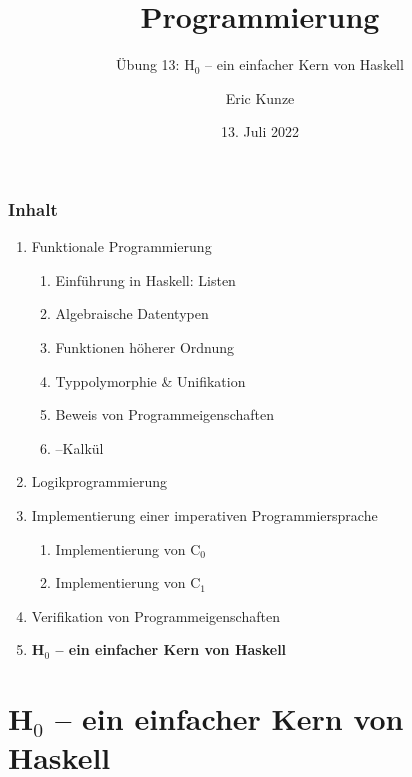 \documentclass{beamer}
\begin{document}
	
	\title{Programmierung}
	\subtitle{Übung 13: H${}_{\text{0}}$ -- ein einfacher Kern von Haskell}
	\author{Eric Kunze}
	\date{13. Juli 2022}
	
	\maketitle
	


\begin{frame}[fragile] \frametitle{Inhalt}
	\begin{enumerate}
		\item Funktionale Programmierung
		\begin{enumerate}
			\item Einführung in Haskell: Listen
			\item Algebraische Datentypen
			\item Funktionen höherer Ordnung
			\item Typpolymorphie \& Unifikation
			\item Beweis von Programmeigenschaften
			\item \textlambda--Kalkül
		\end{enumerate}
		\item Logikprogrammierung
		\item Implementierung einer imperativen Programmiersprache
		\begin{enumerate}
			\item Implementierung von C${}_\text{0}$
			\item Implementierung von C${}_\text{1}$
		\end{enumerate}
		\item Verifikation von Programmeigenschaften
		\item \textbf{H${}_\text{0}$ -- ein einfacher Kern von Haskell}
	\end{enumerate}
\end{frame}


\section{H${}_\text{0}$ -- ein einfacher Kern von Haskell}
\end{document}
